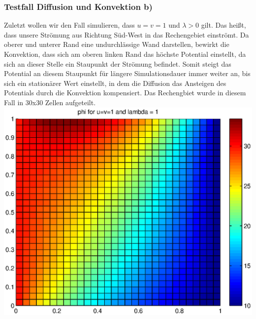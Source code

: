 \documentclass{article}
\begin{document}
\subsubsection{Testfall Diffusion und Konvektion b)}
Zuletzt wollen wir den Fall simulieren, dass $u=v=1$ und $\lambda>0$ gilt. Das heißt, dass unsere Strömung aus Richtung Süd-West in das Rechengebiet
einströmt. Da oberer und unterer Rand eine undurchlässige Wand darstellen, bewirkt die Konvektion, dass sich am oberen linken Rand das höchste Potential einstellt, da sich 
an dieser Stelle ein Staupunkt der Strömung befindet. Somit steigt das Potential an diesem Staupunkt für längere Simulationsdauer immer weiter an, bis sich ein
stationärer Wert einstellt, in dem die Diffusion das Ansteigen des Potentials durch die Konvektion kompensiert. Das Rechengbiet
wurde in diesem Fall in 30x30 Zellen aufgeteilt.\\
\includegraphics[scale=0.6]{test/5conv/uvl.eps}
\end{document}
